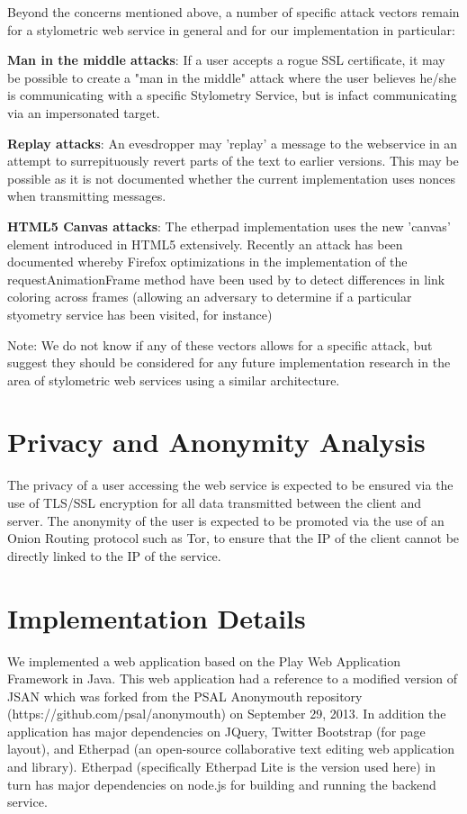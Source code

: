 \documentclass[letterpaper]{article}
\begin{document}
Beyond the concerns mentioned above, a number of specific attack
vectors remain for a stylometric web service in general and for our
implementation in particular:

{\bf Man in the middle attacks}: If a user accepts a rogue SSL certificate, it
may be possible to create a "man in the middle" attack where the user
believes he/she is communicating with a specific Stylometry Service,
but is infact communicating via an impersonated target.

{\bf Replay attacks}: An evesdropper may 'replay' a message to the
webservice in an attempt to surrepituously revert parts of the text to
earlier versions. This may be possible as it is not documented whether
the current implementation uses nonces when transmitting messages.

{\bf HTML5 Canvas attacks}: The etherpad implementation uses the new
'canvas' element introduced in HTML5 extensively. Recently an attack
has been documented \cite{BrowserTiming} whereby Firefox optimizations
in the implementation of the requestAnimationFrame method have been
used by to detect differences in link coloring across frames (allowing
an adversary to determine if a particular styometry service has been
visited, for instance)

Note: We do not know if any of these vectors allows for a specific
attack, but suggest they should be considered for any future
implementation research in the area of stylometric web services using
a similar architecture.

\section{Privacy and Anonymity Analysis}

The privacy of a user accessing the web service is expected to be
ensured via the use of TLS/SSL encryption for all data transmitted
between the client and server. The anonymity of the user is expected
to be promoted via the use of an Onion Routing protocol such as Tor,
to ensure that the IP of the client cannot be directly linked to the
IP of the service.

\section{Implementation Details}

We implemented a web application based on the Play Web Application
Framework in Java. This web application had a reference to a modified
version of JSAN which was forked from the PSAL Anonymouth repository
(https://github.com/psal/anonymouth) on September 29, 2013. In
addition the application has major dependencies on JQuery, Twitter
Bootstrap (for page layout), and Etherpad  (an open-source collaborative text editing
web application and library). Etherpad (specifically Etherpad Lite is
the version used here) in turn has major dependencies on
node.js for building and running the backend service.
\end{document}
